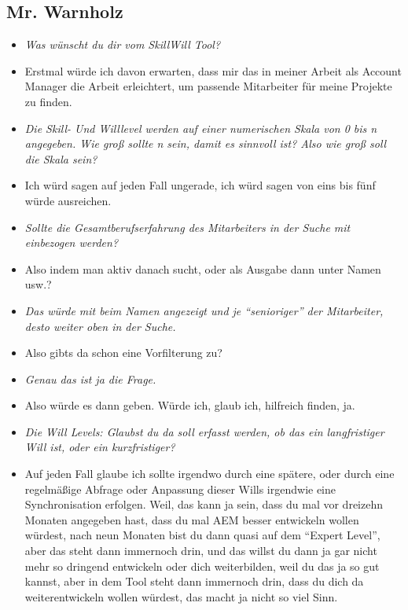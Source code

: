 \begin{appendices}
\newpage

\subsection{Mr. Warnholz}
\begin{itemize}
\item[] \textit{Was wünscht du dir vom SkillWill Tool?}
\item[] Erstmal würde ich davon erwarten, dass mir das in meiner Arbeit als Account Manager die Arbeit erleichtert, um passende Mitarbeiter für meine Projekte zu finden.

\item[] \textit{Die Skill- Und Willlevel werden auf einer numerischen Skala von 0 bis n angegeben. Wie groß sollte n sein, damit es sinnvoll ist? Also wie groß soll die Skala sein?}
\item[] Ich würd sagen auf jeden Fall ungerade, ich würd sagen von eins bis fünf würde ausreichen.

\item[] \textit{Sollte die Gesamtberufserfahrung des Mitarbeiters in der Suche mit einbezogen werden?}
\item[] Also indem man aktiv danach sucht, oder als Ausgabe dann unter Namen usw.?

\item[] \textit{Das würde mit beim Namen angezeigt und je “senioriger” der Mitarbeiter, desto weiter oben in der Suche.}
\item[] Also gibts da schon eine Vorfilterung zu?

\item[] \textit{Genau das ist ja die Frage.}
\item[] Also würde es dann geben. Würde ich, glaub ich, hilfreich finden, ja.

\item[] \textit{Die Will Levels: Glaubst du da soll erfasst werden, ob das ein langfristiger Will ist, oder ein kurzfristiger?}
\item[] Auf jeden Fall glaube ich sollte irgendwo durch eine spätere, oder durch eine regelmäßige Abfrage oder Anpassung dieser Wills irgendwie eine Synchronisation erfolgen. Weil, das kann ja sein, dass du mal vor dreizehn Monaten angegeben hast, dass du mal AEM besser entwickeln wollen würdest, nach neun Monaten bist du dann quasi auf dem “Expert Level”, aber das steht dann immernoch drin, und das willst du dann ja gar nicht mehr so dringend entwickeln oder dich weiterbilden, weil du das ja so gut kannst, aber in dem Tool steht dann immernoch drin, dass du dich da weiterentwickeln wollen würdest, das macht ja nicht so viel Sinn.


\end{itemize}
\end{appendices}
